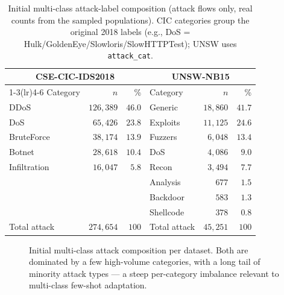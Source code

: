 \documentclass[preprint,12pt,authoryear]{elsarticle}
\begin{document}
\begin{table}[h]
\centering
\caption{Initial multi-class attack-label composition (attack flows only, real
counts from the sampled populations). CIC categories group the original 2018 labels
(e.g., DoS = Hulk/GoldenEye/Slowloris/SlowHTTPTest); UNSW uses \texttt{attack\_cat}.}
\label{tab:attackcomp}
\small
\begin{tabular}{lr r @{\hskip 2em} lr r}
\toprule
\multicolumn{3}{c}{CSE-CIC-IDS2018} & \multicolumn{3}{c}{UNSW-NB15} \\
\cmidrule(lr){1-3}\cmidrule(lr){4-6}
Category & $n$ & \% & Category & $n$ & \% \\
\midrule
DDoS         & $126{,}389$ & $46.0$ & Generic   & $18{,}860$ & $41.7$ \\
DoS          & $65{,}426$  & $23.8$ & Exploits  & $11{,}125$ & $24.6$ \\
BruteForce   & $38{,}174$  & $13.9$ & Fuzzers   & $6{,}048$  & $13.4$ \\
Botnet       & $28{,}618$  & $10.4$ & DoS       & $4{,}086$  & $9.0$  \\
Infiltration & $16{,}047$  & $5.8$  & Recon     & $3{,}494$  & $7.7$  \\
             &             &        & Analysis  & $677$      & $1.5$  \\
             &             &        & Backdoor  & $583$      & $1.3$  \\
             &             &        & Shellcode & $378$      & $0.8$  \\
\midrule
Total attack & $274{,}654$ & $100$ & Total attack & $45{,}251$ & $100$ \\
\bottomrule
\end{tabular}
\end{table}

\begin{figure}[h]
\centering
\resizebox{0.95\linewidth}{!}{}
\caption{Initial multi-class attack composition per dataset. Both are dominated by
a few high-volume categories, with a long tail of minority attack types --- a steep
per-category imbalance relevant to multi-class few-shot adaptation.}
\label{fig:attackcomp}
\end{figure}
\end{document}
